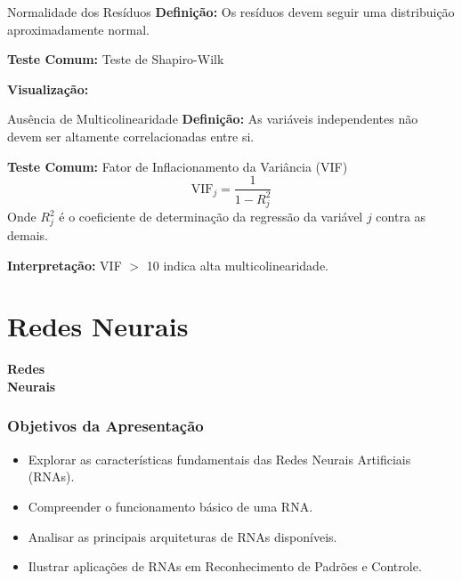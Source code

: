 \documentclass{beamer}
\begin{document}
\begin{frame}{Normalidade dos Resíduos}
    \textbf{Definição:}
    Os resíduos devem seguir uma distribuição aproximadamente normal.

    \vspace{0.5cm}
    \textbf{Teste Comum:} Teste de Shapiro-Wilk

    \vspace{0.5cm}
    \textbf{Visualização:}
\end{frame}


\begin{frame}{Ausência de Multicolinearidade}
    \textbf{Definição:}
    As variáveis independentes não devem ser altamente correlacionadas entre si.

    \vspace{0.5cm}
    \textbf{Teste Comum:} Fator de Inflacionamento da Variância (VIF)
    \begin{equation}
        \text{VIF}_j = \frac{1}{1 - R_j^2}
    \end{equation}
    Onde $R_j^2$ é o coeficiente de determinação da regressão da variável $j$ contra as demais.

    \vspace{0.5cm}
    \textbf{Interpretação:} VIF $>$ 10 indica alta multicolinearidade.
\end{frame}





\section{Redes Neurais}
\begin{frame}
\centering
\Huge
\textbf{Redes \\ Neurais}
\end{frame}

\begin{frame}
\frametitle{Objetivos da Apresentação}
\begin{itemize}
    \item Explorar as características fundamentais das Redes Neurais Artificiais (RNAs).
    \item Compreender o funcionamento básico de uma RNA.
    \item Analisar as principais arquiteturas de RNAs disponíveis.
    \item Ilustrar aplicações de RNAs em Reconhecimento de Padrões e Controle.
\end{itemize}
\end{frame}
\end{document}

